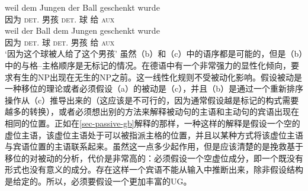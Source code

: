 \ex 
\gll weil dem Jungen der Ball geschenkt wurde\\
     因为 \textsc{det}.\dat{} 男孩 \textsc{det}.\nom{} 球 给 \textsc{aux}\\
\ex 
\gll weil der Ball dem Jungen geschenkt wurde\\
     因为 \textsc{det}.\nom{} 球 \textsc{det}.\dat{} 男孩 给 \textsc{aux}\\
\glt `因为这个球被人给了这个男孩'
\zl
虽然（b）和（c）中的语序都是可能的，但是（b）中的与格--主格顺序是无标记的情况。在德语中有一个非常强力的显性化倾向，要求有生的NP出现在无生的NP之前\citep[]{Hoberg81a}。这一线性化规则不受被动化影响。假设被动是一种移位的理论或者必须假设（a）的被动是（c），并且（b）是通过一个重新排序操作从（c）推导出来的（这应该是不可行的，因为通常假设越是标记的构式需要越多的转换），或者必须想出别的方法来解释被动句的主语和主动句的宾语出现在相同的位置。正如在\ref{sec-passive-gb}解释的那样，一种这样的解释是假设一个空的虚位主语，该虚位主语处于可以被指派主格的位置，并且以某种方式将该虚位主语与宾语位置的主语联系起来。虽然这一点多少起作用，但是应该清楚的是挽救基于移位的对被动的分析，代价是非常高的：必须假设一个空虚位成分，即一个既没有形式也没有意义的成分。存在这样一个宾语不能从输入中推断出来，除非假设结构是给定的。所以，必须要假设一个更加丰富的UG\indexugc。
